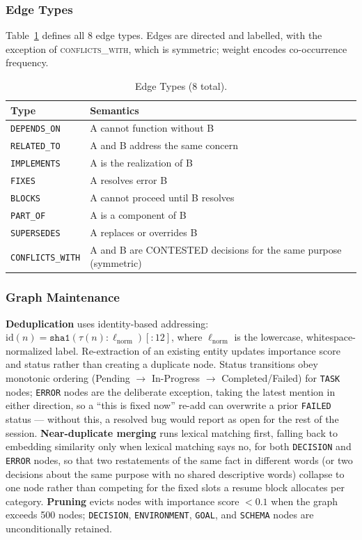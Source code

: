 \documentclass[journal]{IEEEtran}
\begin{document}
\subsubsection{Edge Types}
Table~\ref{tab:edgetypes} defines all 8 edge types.
Edges are directed and labelled, with the exception of
\textsc{conflicts\_with}, which is symmetric; weight encodes
co-occurrence frequency.

\begin{table}[t]
  \centering
  \caption{Edge Types (8 total).}
  \label{tab:edgetypes}
  \renewcommand{\arraystretch}{1.2}
  \begin{tabular}{@{}p{2.3cm}p{5.3cm}@{}}
    \toprule
    \textbf{Type} & \textbf{Semantics} \\
    \midrule
    \texttt{DEPENDS\_ON}    & A cannot function without B \\
    \texttt{RELATED\_TO}    & A and B address the same concern \\
    \texttt{IMPLEMENTS}     & A is the realization of B \\
    \texttt{FIXES}          & A resolves error B \\
    \texttt{BLOCKS}         & A cannot proceed until B resolves \\
    \texttt{PART\_OF}       & A is a component of B \\
    \texttt{SUPERSEDES}     & A replaces or overrides B \\
    \texttt{CONFLICTS\_WITH}& A and B are CONTESTED decisions for the same purpose (symmetric) \\
    \bottomrule
  \end{tabular}
\end{table}

\subsubsection{Graph Maintenance}
\textbf{Deduplication} uses identity-based addressing:
$\mathrm{id}(n) = \texttt{sha1}(\tau(n):\ell_\mathrm{norm})[:12]$,
where $\ell_\mathrm{norm}$ is the lowercase, whitespace-normalized
label.
Re-extraction of an existing entity updates importance score
and status rather than creating a duplicate node.
Status transitions obey monotonic ordering
(Pending $\to$ In-Progress $\to$ Completed/Failed) for
\texttt{TASK} nodes; \texttt{ERROR} nodes are the deliberate
exception, taking the latest mention in either direction, so a
``this is fixed now'' re-add can overwrite a prior
\texttt{FAILED} status --- without this, a resolved bug would
report as open for the rest of the session.
\textbf{Near-duplicate merging} runs lexical matching first,
falling back to embedding similarity only when lexical
matching says no, for both \texttt{DECISION} and
\texttt{ERROR} nodes, so that two restatements of the same
fact in different words (or two decisions about the same
purpose with no shared descriptive words) collapse to one node
rather than competing for the fixed slots a resume block
allocates per category.
\textbf{Pruning} evicts nodes with importance score $< 0.1$
when the graph exceeds 500 nodes; \texttt{DECISION},
\texttt{ENVIRONMENT}, \texttt{GOAL}, and \texttt{SCHEMA} nodes
are unconditionally retained.
\end{document}

